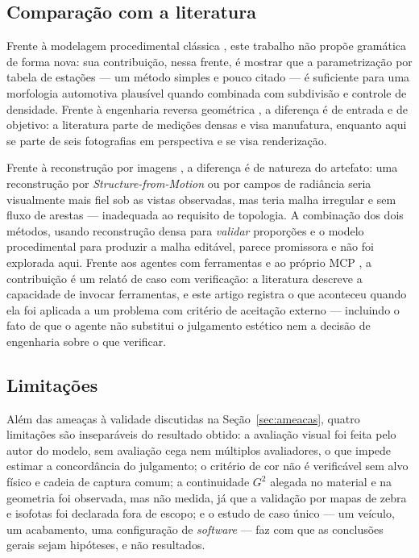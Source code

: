\subsection{Compara\c{c}\~ao com a literatura}

Frente \`a modelagem procedimental cl\'assica \cite{parish2001, muller2006, mccormack2004},
este trabalho n\~ao prop\~oe gram\'atica de forma nova: sua contribui\c{c}\~ao, nessa
frente, \'e mostrar que a parametriza\c{c}\~ao por tabela de esta\c{c}\~oes --- um
m\'etodo simples e pouco citado --- \'e suficiente para uma morfologia automotiva
plaus\'ivel quando combinada com subdivis\~ao e controle de densidade. Frente \`a
engenharia reversa geom\'etrica \cite{varady1997, otto2001}, a diferen\c{c}a \'e de
entrada e de objetivo: a literatura parte de medi\c{c}\~oes densas e visa manufatura,
enquanto aqui se parte de seis fotografias em perspectiva e se visa
renderiza\c{c}\~ao.

Frente \`a reconstru\c{c}\~ao por imagens \cite{snavely2006, mildenhall2020, kerbl2023},
a diferen\c{c}a \'e de natureza do artefato: uma reconstru\c{c}\~ao por
\emph{Structure-from-Motion} ou por campos de radi\^ancia seria visualmente mais fiel
sob as vistas observadas, mas teria malha irregular e sem fluxo de arestas --- inadequada
ao requisito de topologia. A combina\c{c}\~ao dos dois m\'etodos, usando
reconstru\c{c}\~ao densa para \emph{validar} propor\c{c}\~oes e o modelo procedimental
para produzir a malha edit\'avel, parece promissora e n\~ao foi explorada aqui. Frente
aos agentes com ferramentas \cite{schick2023, qin2023, yao2023} e ao pr\'oprio MCP
\cite{mcpspec2024}, a contribui\c{c}\~ao \'e um relat\'o de caso com
verifica\c{c}\~ao: a literatura descreve a capacidade de invocar ferramentas, e este
artigo registra o que aconteceu quando ela foi aplicada a um problema com crit\'erio de
aceita\c{c}\~ao externo --- incluindo o fato de que o agente n\~ao substitui o
julgamento est\'etico nem a decis\~ao de engenharia sobre o que verificar.

\subsection{Limita\c{c}\~oes}

Al\'em das amea\c{c}as \`a validade discutidas na Se\c{c}\~ao~\ref{sec:ameacas}, quatro
limita\c{c}\~oes s\~ao insepar\'aveis do resultado obtido: a avalia\c{c}\~ao visual foi
feita pelo autor do modelo, sem avalia\c{c}\~ao cega nem m\'ultiplos avaliadores, o que
impede estimar a concord\^ancia do julgamento; o crit\'erio de cor n\~ao \'e
verific\'avel sem alvo f\'isico e cadeia de captura comum; a continuidade $G^2$ alegada
no material e na geometria foi observada, mas n\~ao medida, j\'a que a
valida\c{c}\~ao por mapas de zebra e isofotas foi declarada fora de escopo; e o estudo
de caso \'unico --- um ve\'iculo, um acabamento, uma configura\c{c}\~ao de
\emph{software} --- faz com que as conclus\~oes gerais sejam hip\'oteses, e n\~ao
resultados.

